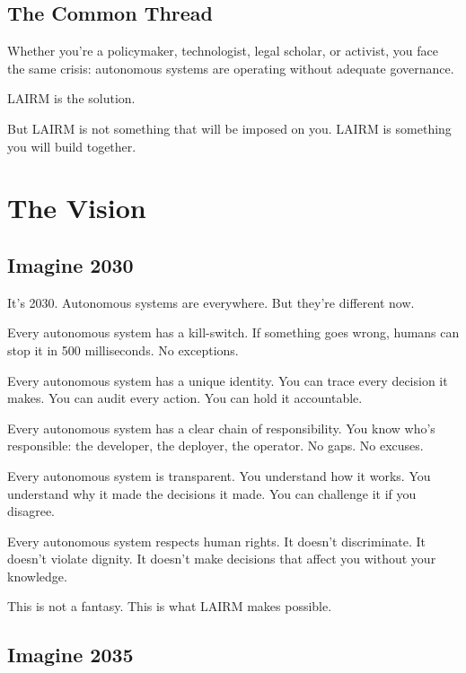 \documentclass[12pt,a4paper,twoside,openright]{book}
\begin{document}
\section*{The Common Thread}

Whether you're a policymaker, technologist, legal scholar, or activist, you face the same crisis: autonomous systems are operating without adequate governance.

LAIRM is the solution.

But LAIRM is not something that will be imposed on you. LAIRM is something you will build together.

\cleardoublepage

\chapter*{The Vision}

\section*{Imagine 2030}

It's 2030. Autonomous systems are everywhere. But they're different now.

Every autonomous system has a kill-switch. If something goes wrong, humans can stop it in 500 milliseconds. No exceptions.

Every autonomous system has a unique identity. You can trace every decision it makes. You can audit every action. You can hold it accountable.

Every autonomous system has a clear chain of responsibility. You know who's responsible: the developer, the deployer, the operator. No gaps. No excuses.

Every autonomous system is transparent. You understand how it works. You understand why it made the decisions it made. You can challenge it if you disagree.

Every autonomous system respects human rights. It doesn't discriminate. It doesn't violate dignity. It doesn't make decisions that affect you without your knowledge.

This is not a fantasy. This is what LAIRM makes possible.

\section*{Imagine 2035}
\end{document}
